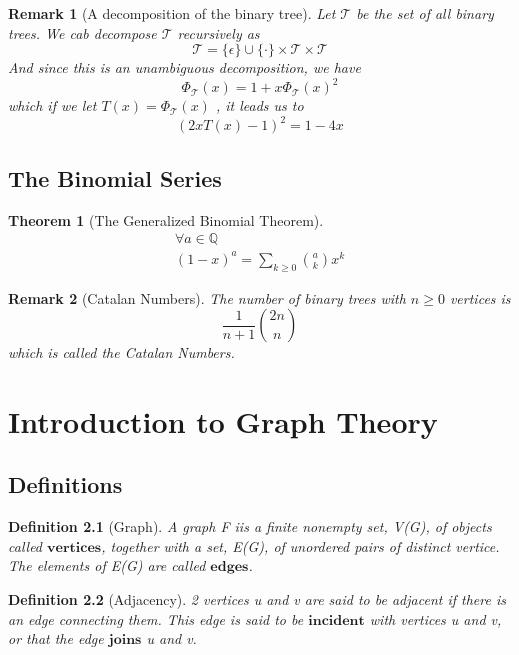 \documentclass[11pt, oneside]{book}
\theoremstyle{break}
\newtheorem{thm}{Theorem}[section]
\newtheorem{defn}{Definition}[section]
\newtheorem*{remark}{Remark}
\newcommand{\bb}[1]{\mathbb{#1}}		%
\begin{document}
\begin{remark}[A decomposition of the binary tree]
	Let $\mathscr{T}$ be the set of all binary trees. We cab decompose $\mathscr{T}$ recursively as
	\[
		\mathscr{T} = \{\epsilon\} \cup \{\cdot\} \times \mathscr{T} \times \mathscr{T}
	\]
	And since this is an unambiguous decomposition, we have
	\[
		\Phi_{\mathscr{T}}(x) = 1 + x\Phi_{\mathscr{T}}(x)^2
	\]
	which if we let $T(x) = \Phi_{\mathscr{T}}(x)$ , it leads us to
	\[
		(2xT(x) - 1)^2 = 1 - 4x
	\]
\end{remark}


\section{The Binomial Series}

\begin{thm}[The Generalized Binomial Theorem]
	\begin{gather*}
		\forall a \in \bb{Q} \\
		(1 - x)^a = \sum_{k \geq 0} \binom{a}{k}x^k
	\end{gather*}
\end{thm}

\begin{remark}[Catalan Numbers]
	The number of binary trees with $n \geq 0$ vertices is
	\[
		\frac{1}{n + 1} \binom{2n}{n}
	\]
	which is called the Catalan Numbers.
\end{remark}



\chapter{Introduction to Graph Theory}


\section{Definitions}

\begin{defn}[Graph]
	A graph F iis a finite nonempty set, V(G), of objects called $\textbf{vertices}$, together with a set, E(G), of unordered pairs of distinct vertice. The elements of E(G) are called $\textbf{edges}$.
\end{defn}

\begin{defn}[Adjacency]
	2 vertices u and v are said to be adjacent if there is an edge connecting them. This edge is said to be $\textbf{incident}$ with vertices u and v, or that the edge $\textbf{joins}$ u and v.
\end{defn}
\end{document}
